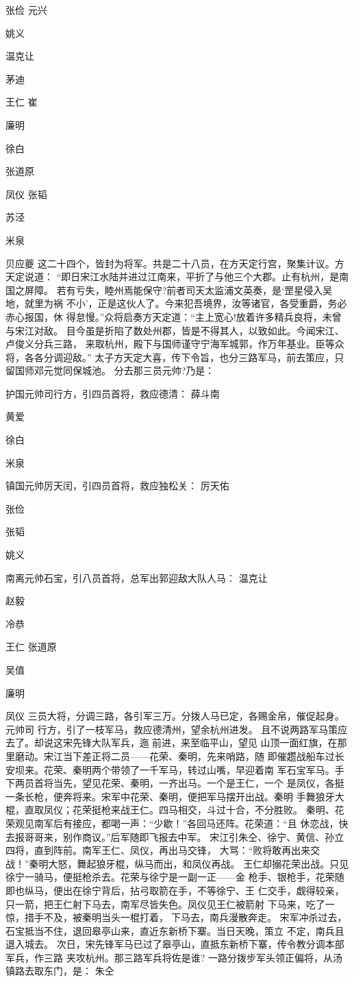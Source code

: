 张俭
元兴

姚义

温克让

茅迪

王仁
崔

廉明

徐白

张道原

凤仪
张韬

苏泾

米泉

贝应夔
这二十四个，皆封为将军。共是二十八员，在方天定行宫，聚集计议。方天定说道：
“即日宋江水陆并进过江南来，平折了与他三个大郡。止有杭州，是南国之屏障。
若有亏失，睦州焉能保守?前者司天太监浦文英奏，是‘罡星侵入吴地，就里为祸
不小’，正是这伙人了。今来犯吾境界，汝等诸官，各受重爵，务必赤心报国，休
得怠慢。”众将启奏方天定道：“主上宽心!放着许多精兵良将，未曾与宋江对敌。
目今虽是折陷了数处州郡，皆是不得其人，以致如此。今闻宋江、卢俊义分兵三路，
来取杭州，殿下与国师谨守宁海军城郭，作万年基业。臣等众将，各各分调迎敌。”
太子方天定大喜，传下令旨，也分三路军马，前去策应，只留国师邓元觉同保城池。
分去那三员元帅?乃是：

护国元帅司行方，引四员首将，救应德清：
薛斗南

黄爱

徐白

米泉

镇国元帅厉天闰，引四员首将，救应独松关：
厉天佑

张俭

张韬

姚义

南离元帅石宝，引八员首将，总军出郭迎敌大队人马：
温克让

赵毅

冷恭

王仁
张道原

吴值

廉明

凤仪
三员大将，分调三路，各引军三万。分拨人马已定，各赐金帛，催促起身。元帅司
行方，引了一枝军马，救应德清州，望余杭州进发。
且不说两路军马策应去了。却说这宋先锋大队军兵，迤前进，来至临平山，望见
山顶一面红旗，在那里磨动。宋江当下差正将二员——花荣、秦明，先来哨路，随
即催趱战船车过长安坝来。花荣、秦明两个带领了一千军马，转过山嘴，早迎着南
军石宝军马。手下两员首将当先，望见花荣、秦明，一齐出马。一个是王仁，一个
是凤仪，各挺一条长枪，便奔将来。宋军中花荣、秦明，便把军马摆开出战。秦明
手舞狼牙大棍，直取凤仪；花荣挺枪来战王仁。四马相交，斗过十合，不分胜败。
秦明、花荣观见南军后有接应，都喝一声：“少歇！”各回马还阵。花荣道：“且
休恋战，快去报哥哥来，别作商议。”后军随即飞报去中军。
宋江引朱仝、徐宁、黄信、孙立四将，直到阵前。南军王仁、凤仪，再出马交锋，
大骂：“败将敢再出来交战！”秦明大怒，舞起狼牙棍，纵马而出，和凤仪再战。
王仁却搦花荣出战。只见徐宁一骑马，便挺枪杀去。花荣与徐宁是一副一正——金
枪手、银枪手，花荣随即也纵马，便出在徐宁背后，拈弓取箭在手，不等徐宁、王
仁交手，觑得较亲，只一箭，把王仁射下马去，南军尽皆失色。凤仪见王仁被箭射
下马来，吃了一惊，措手不及，被秦明当头一棍打着，下马去，南兵漫散奔走。
宋军冲杀过去，石宝抵当不住，退回皋亭山来，直近东新桥下寨。当日天晚，策立
不定，南兵且退入城去。
次日，宋先锋军马已过了皋亭山，直抵东新桥下寨，传令教分调本部军兵，作三路
夹攻杭州。那三路军兵将佐是谁?
一路分拨步军头领正偏将，从汤镇路去取东门，是：
朱仝

